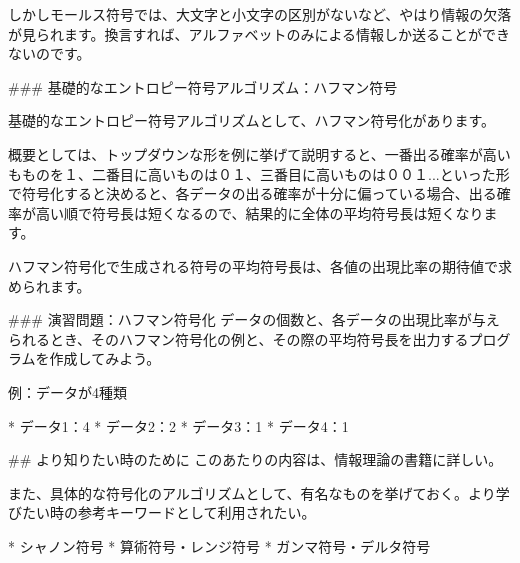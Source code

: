 しかしモールス符号では、大文字と小文字の区別がないなど、やはり情報の欠落が見られます。換言すれば、アルファベットのみによる情報しか送ることができないのです。

### 基礎的なエントロピー符号アルゴリズム：ハフマン符号

基礎的なエントロピー符号アルゴリズムとして、ハフマン符号化があります。

概要としては、トップダウンな形を例に挙げて説明すると、一番出る確率が高いもものを１、二番目に高いものは０１、三番目に高いものは００１...といった形で符号化すると決めると、各データの出る確率が十分に偏っている場合、出る確率が高い順で符号長は短くなるので、結果的に全体の平均符号長は短くなります。

ハフマン符号化で生成される符号の平均符号長は、各値の出現比率の期待値で求められます。

### 演習問題：ハフマン符号化
データの個数と、各データの出現比率が与えられるとき、そのハフマン符号化の例と、その際の平均符号長を出力するプログラムを作成してみよう。

例：データが4種類

* データ1：4
* データ2：2
* データ3：1
* データ4：1

## より知りたい時のために
このあたりの内容は、情報理論の書籍に詳しい。

また、具体的な符号化のアルゴリズムとして、有名なものを挙げておく。より学びたい時の参考キーワードとして利用されたい。

* シャノン符号
* 算術符号・レンジ符号
* ガンマ符号・デルタ符号


